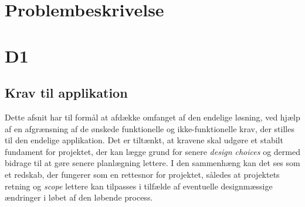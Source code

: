 \documentclass[12pt, a4paper]{article}
\begin{document}
    

\section{Problembeskrivelse}

\section{D1}

\subsection{Krav til applikation}
Dette afsnit har til formål at afdække omfanget af den endelige løsning, ved hjælp af en afgrænsning af de ønskede funktionelle og ikke-funktionelle krav, der stilles til den endelige applikation. Det er tiltænkt, at kravene skal udgøre et stabilt fundament for projektet, der kan lægge grund for senere \emph{design choices} og dermed bidrage til at gøre senere planlægning lettere. I den sammenhæng kan det ses som et redskab, der fungerer som en rettesnor for projektet, således at projektets retning og \emph{scope} lettere kan tilpasses i tilfælde af eventuelle designmæssige ændringer i løbet af den løbende process. 
\end{document}
